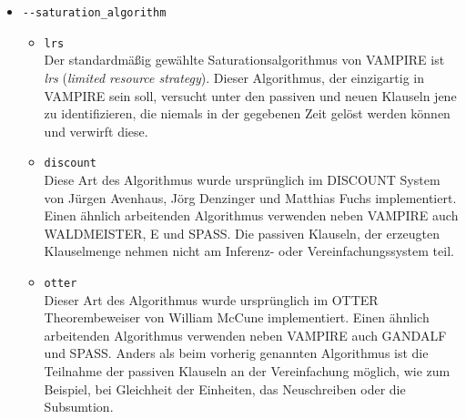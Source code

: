 \documentclass{article}
\begin{document}
\begin{itemize}
\item \verb|--saturation_algorithm| \label{arg:saturationalgorithm}
\begin{itemize}
	\item \verb|lrs|\\
	Der standardmäßig gewählte Saturationsalgorithmus von VAMPIRE ist \emph{lrs} (\emph{limited resource strategy}).
	Dieser Algorithmus, der einzigartig in VAMPIRE sein soll, versucht unter den passiven und neuen Klauseln jene zu identifizieren, die niemals in der gegebenen Zeit gelöst werden können und verwirft diese. \cite{riazanov2003limited}
	\item \verb|discount|\\
	Diese Art des Algorithmus wurde ursprünglich im DISCOUNT System von Jürgen Avenhaus, Jörg Denzinger und Matthias Fuchs implementiert.
	Einen ähnlich arbeitenden Algorithmus verwenden neben VAMPIRE auch WALDMEISTER, E und SPASS. 
	Die passiven Klauseln, der erzeugten Klauselmenge nehmen nicht am Inferenz- oder Vereinfachungssystem teil. \cite{riazanov2003limited} \\
	\item \verb|otter|\\
	Dieser Art des Algorithmus wurde ursprünglich im OTTER Theorembeweiser von William McCune implementiert.
	Einen ähnlich arbeitenden Algorithmus verwenden neben VAMPIRE auch GANDALF und SPASS. 
	Anders als beim vorherig genannten Algorithmus ist die Teilnahme der passiven Klauseln an der Vereinfachung möglich, wie zum Beispiel, bei Gleichheit der Einheiten, das Neuschreiben oder die Subsumtion. \cite{riazanov2003limited} \\
\end{itemize}


\end{itemize}
\end{document}
